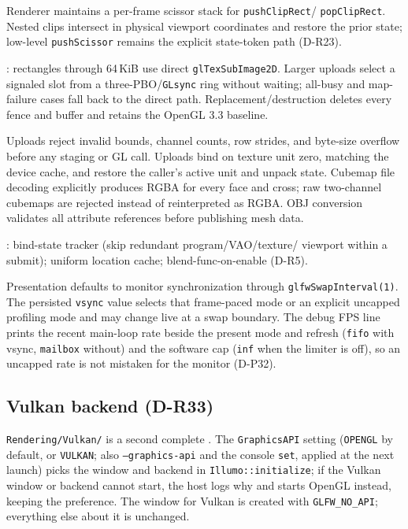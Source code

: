 Renderer maintains a per-frame scissor stack for \texttt{pushClipRect}/
\texttt{popClipRect}. Nested clips intersect in physical viewport coordinates
and restore the prior state; low-level \texttt{pushScissor} remains the explicit
state-token path (D-R23).

: rectangles through 64\,KiB use direct
\texttt{glTexSubImage2D}. Larger uploads select a signaled slot from a
three-PBO/\texttt{GLsync} ring without waiting; all-busy and map-failure cases
fall back to the direct path. Replacement/destruction deletes every fence and
buffer and retains the OpenGL 3.3 baseline.

Uploads reject invalid bounds, channel counts, row strides, and byte-size
overflow before any staging or GL call. Uploads bind on texture unit zero,
matching the device cache, and restore the caller's active unit and unpack
state. Cubemap file decoding explicitly produces RGBA for every face and cross;
raw two-channel cubemaps are rejected instead of reinterpreted as RGBA. OBJ
conversion validates all attribute references before publishing mesh data.

: bind-state tracker (skip redundant program/VAO/texture/
viewport within a submit); uniform location cache; blend-func-on-enable (D-R5).

Presentation defaults to monitor synchronization through
\texttt{glfwSwapInterval(1)}. The persisted \texttt{vsync} value selects that
frame-paced mode or an explicit uncapped profiling mode and may change live at
a swap boundary. The debug FPS line prints the recent main-loop rate beside
the present mode and refresh (\texttt{fifo} with vsync, \texttt{mailbox}
without) and the software cap (\texttt{inf} when the limiter is off), so an
uncapped rate is not mistaken for the monitor (D-P32).

\subsection{Vulkan backend (D-R33)}
\texttt{Rendering/Vulkan/} is a second complete . The
\texttt{GraphicsAPI} setting (\texttt{OPENGL} by default, or \texttt{VULKAN};
also \texttt{--graphics-api} and the console \texttt{set}, applied at the next
launch) picks the window and backend in \texttt{Illumo::initialize}; if the
Vulkan window or backend cannot start, the host logs why and starts OpenGL
instead, keeping the preference. The window for Vulkan is created with
\texttt{GLFW\_NO\_API}; everything else about it is unchanged.

